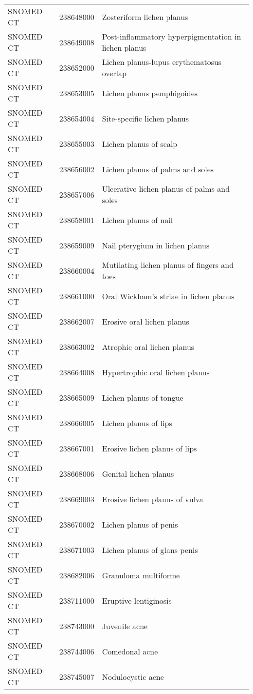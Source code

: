 \begin{longtable}{p{}p{}p{}}
  SNOMED CT & 238648000 & Zosteriform lichen planus \\ 
  SNOMED CT & 238649008 & Post-inflammatory hyperpigmentation in lichen planus \\ 
  SNOMED CT & 238652000 & Lichen planus-lupus erythematosus overlap \\ 
  SNOMED CT & 238653005 & Lichen planus pemphigoides \\ 
  SNOMED CT & 238654004 & Site-specific lichen planus \\ 
  SNOMED CT & 238655003 & Lichen planus of scalp \\ 
  SNOMED CT & 238656002 & Lichen planus of palms and soles \\ 
  SNOMED CT & 238657006 & Ulcerative lichen planus of palms and soles \\ 
  SNOMED CT & 238658001 & Lichen planus of nail \\ 
  SNOMED CT & 238659009 & Nail pterygium in lichen planus \\ 
  SNOMED CT & 238660004 & Mutilating lichen planus of fingers and toes \\ 
  SNOMED CT & 238661000 & Oral Wickham's striae in lichen planus \\ 
  SNOMED CT & 238662007 & Erosive oral lichen planus \\ 
  SNOMED CT & 238663002 & Atrophic oral lichen planus \\ 
  SNOMED CT & 238664008 & Hypertrophic oral lichen planus \\ 
  SNOMED CT & 238665009 & Lichen planus of tongue \\ 
  SNOMED CT & 238666005 & Lichen planus of lips \\ 
  SNOMED CT & 238667001 & Erosive lichen planus of lips \\ 
  SNOMED CT & 238668006 & Genital lichen planus \\ 
  SNOMED CT & 238669003 & Erosive lichen planus of vulva \\ 
  SNOMED CT & 238670002 & Lichen planus of penis \\ 
  SNOMED CT & 238671003 & Lichen planus of glans penis \\ 
  SNOMED CT & 238682006 & Granuloma multiforme \\ 
  SNOMED CT & 238711000 & Eruptive lentiginosis \\ 
  SNOMED CT & 238743000 & Juvenile acne \\ 
  SNOMED CT & 238744006 & Comedonal acne \\ 
  SNOMED CT & 238745007 & Nodulocystic acne \\ 

\end{longtable}
